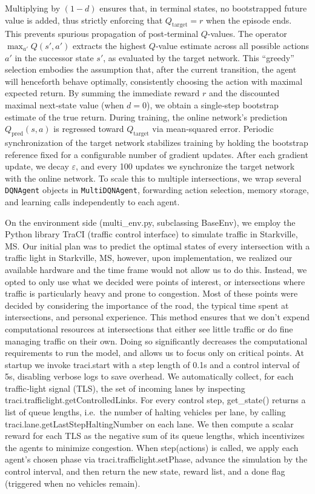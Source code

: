 \documentclass[conference]{IEEEtran}
\begin{document}
Multiplying by $(1 - d)$ ensures that, in terminal states, no bootstrapped future value is added, thus strictly enforcing that $Q_{\mathrm{target}} = r$ when the episode ends. This prevents spurious propagation of post‐terminal $Q$-values. The operator $\max_{a'} Q(s',a')$ extracts the highest $Q$‐value estimate across all possible actions $a'$ in the successor state $s'$, as evaluated by the target network. This “greedy” selection embodies the assumption that, after the current transition, the agent will henceforth behave optimally, consistently choosing the action with maximal expected return. By summing the immediate reward $r$ and the discounted maximal next‐state value (when $d = 0$), we obtain a single‐step bootstrap estimate of the true return. During training, the online network’s prediction $Q_{\mathrm{pred}}(s,a)$ is regressed toward $Q_{\mathrm{target}}$ via mean‐squared error. Periodic synchronization of the target network stabilizes training by holding the bootstrap reference fixed for a configurable number of gradient updates. After each gradient update, we decay $\varepsilon$, and every 100 updates we synchronize the target network with the online network. To scale this to multiple intersections, we wrap several {\tt DQNAgent} objects in {\tt MultiDQNAgent}, forwarding action selection, memory storage, and learning calls independently to each agent.

On the environment side (multi\_env.py, subclassing BaseEnv), we employ the Python library TraCI (traffic control interface) to simulate traffic in Starkville, MS. Our initial plan was to predict the optimal states of every intersection with a traffic light in Starkville, MS, however, upon implementation, we realized our available hardware and the time frame would not allow us to do this. Instead, we opted to only use what we decided were points of interest, or intersections where traffic is particularly heavy and prone to congestion. Most of these points were decided by considering the importance of the road, the typical time spent at intersections, and personal experience. This method ensures that we don't expend computational resources at intersections that either see little traffic or do fine managing traffic on their own. Doing so significantly decreases the computational requirements to run the model, and allows us to focus only on critical points. At startup we invoke traci.start with a step length of 0.1s and a control interval of 5s, disabling verbose logs to save overhead. We automatically collect, for each traffic‐light signal (TLS), the set of incoming lanes by inspecting traci.trafficlight.getControlledLinks. For every control step, get\_state() returns a list of queue lengths, i.e.\ the number of halting vehicles per lane, by calling traci.lane.getLastStepHaltingNumber on each lane. We then compute a scalar reward for each TLS as the negative sum of its queue lengths, which incentivizes the agents to minimize congestion. When step(actions) is called, we apply each agent’s chosen phase via traci.trafficlight.setPhase, advance the simulation by the control interval, and then return the new state, reward list, and a done flag (triggered when no vehicles remain).
\end{document}
